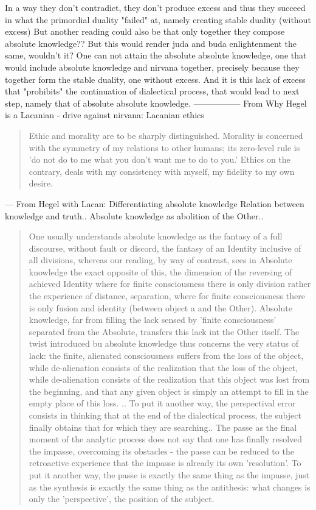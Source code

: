 \documentclass[10pt]{book}
\begin{document}
In a way they don't contradict, they don't produce excess and thus they succeed in what the primordial duality "failed" at, namely creating stable duality (without excess)
But another reading could also be that only together they compose absolute knowledge?? But this would render juda and buda enlightenment the same, wouldn't it?
One can not attain the absolute absolute knowledge, one that would include absolute knowledge and nirvana together, precisely because they together form the stable duality, one without excess. And it is this lack of excess that "prohibits" the continuation of dialectical process, that would lead to next step, namely that of absolute absolute knowledge.
-----------------
From Why Hegel is a Lacanian - drive against nirvana: Lacanian ethics
\begin{quotation}
Ethic and morality are to be sharply distinguished. Morality is concerned with the symmetry of my relations to other humans; its zero-level rule is 'do not do to me what you don't want me to do to you.' Ethics on the contrary, deals with my consistency with myself, my fidelity to my own desire.
\end{quotation}
---
From Hegel with Lacan: Differentiating absolute knowledge
Relation between knowledge and truth..
Absolute knowledge as abolition of the Other..
\begin{quotation}
One usually understands absolute knowledge as the fantasy of a full discourse, without fault or discord, the fantasy of an Identity inclusive of all divisions, whereas our reading, by way of contrast, sees in Absolute knowledge the exact opposite of this, the dimension of the reversing of achieved Identity where for finite consciousness there is only division rather the experience of distance, separation, where for finite consciousness there is only fusion and identity (between object a and the Other). Absolute knowledge, far from filling the lack sensed by 'finite consciousness' separated from the Absolute, transfers this lack int the Other itself. The twist introduced bu absolute knowledge thus concerns the very status of lack: the finite, alienated consciousness suffers from the loss of the object, while de-alienation consists of the realization that the loss of the object, while de-alienation consists of the realization that this object was lost from the beginning, and that any given object is simply an attempt to fill in the empty place of this loss.
.. To put it another way, the perspectival error consists in thinking that at the end of the dialectical process, the subject finally obtains that for which they are searching..
The passe as the final moment of the analytic process does not say that one has finally resolved the impasse, overcoming its obstacles - the passe can be reduced to the retroactive experience that the impasse is already its own 'resolution'. To put it another way, the passe is exactly the same thing as the impasse, just as the synthesis is exactly the same thing as the antithesis: what changes is only the 'perspective', the position of the subject.
\end{quotation}
\end{document}
